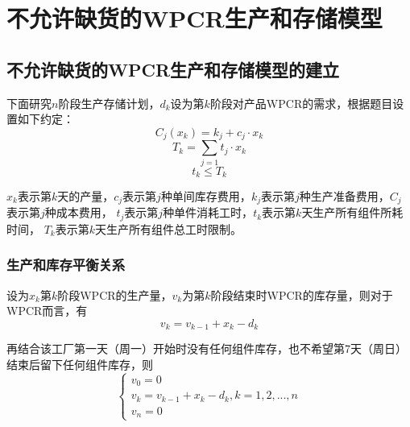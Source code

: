 %
%
%
%
%

\chapter{不允许缺货的WPCR生产和存储模型}

\section{不允许缺货的WPCR生产和存储模型的建立}

下面研究$n$阶段生产存储计划，$d_k$设为第$k$阶段对产品WPCR的需求，根据题目设置如下约定：
\begin{equation}
    C_j(x_k)=k_j + c_j \cdot x_k
\end{equation}
\begin{equation}
    T_k=\sum_{j=1}t_j \cdot x_k
\end{equation}
\begin{equation}
    t_k \leq T_k
\end{equation}

$x_k$表示第$k$天的产量，$c_j$表示第$j$种单间库存费用，$k_j$表示第$j$种生产准备费用，$C_j$表示第$j$种成本费用，
$t_j$表示第$j$种单件消耗工时，$t_k$表示第$k$天生产所有组件所耗时间，
$T_k$表示第$k$天生产所有组件总工时限制。

\subsection{生产和库存平衡关系}

设为$x_k$第$k$阶段WPCR的生产量，$v_k$为第$k$阶段结束时WPCR的库存量，则对于WPCR而言，有
\begin{equation}
    v_k = v_{k-1} + x_k - d_k
\end{equation}

再结合该工厂第一天（周一）开始时没有任何组件库存，也不希望第7天（周日）结束后留下任何组件库存，则
\begin{equation}
    \begin{cases}
        v_0=0 \\ 
        v_k=v_{k-1} + x_k - d_k,k=1,2,...,n \\ 
        v_n=0
    \end{cases}
\end{equation}

